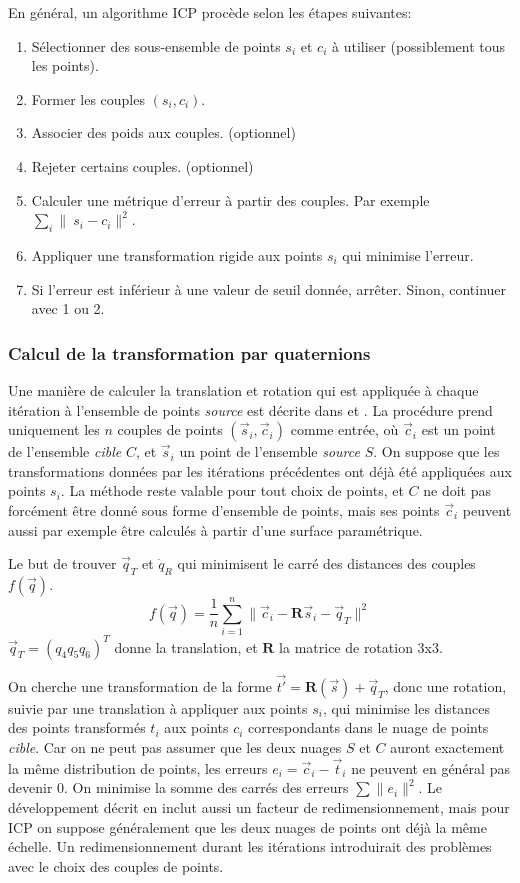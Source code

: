 \documentclass[a4paper,10pt]{scrreprt}
\begin{document}
En général, un algorithme ICP procède selon les étapes suivantes:
\begin{enumerate}
	\item Sélectionner des sous-ensemble de points ${s_i}$ et ${c_i}$ à utiliser (possiblement tous les points).
	\item Former les couples $(s_i, c_i)$.
	\item Associer des poids aux couples. (optionnel)
	\item Rejeter certains couples. (optionnel)
	\item Calculer une métrique d'erreur à partir des couples. Par exemple $\sum_{i} \|\ s_i - c_i \|^2$.
	\item Appliquer une transformation rigide aux points ${s_i}$ qui minimise l'erreur.
	\item Si l'erreur est inférieur à une valeur de seuil donnée, arrêter. Sinon, continuer avec 1 ou 2. 
\end{enumerate}


\subsubsection{Calcul de la transformation par quaternions}
Une manière de calculer la translation et rotation qui est appliquée à chaque itération à l'ensemble de points \emph{source} est décrite dans \cite{Besl1992} et \cite{Horn1986}. La procédure prend uniquement les $n$ couples de points $(\vec{s}_i, \vec{c}_i)$ comme entrée, où $\vec{c}_i$ est un point de l'ensemble \emph{cible} $C$, et $\vec{s}_i$ un point de l'ensemble \emph{source} $S$. On suppose que les transformations données par les itérations précédentes ont déjà été appliquées aux points $s_i$. La méthode reste valable pour tout choix de points, et $C$ ne doit pas forcément être donné sous forme d'ensemble de points, mais ses points $\vec{c}_i$ peuvent aussi par exemple être calculés à partir d'une surface paramétrique.

Le but de trouver $\vec{q}_T$ et $\dot{q}_R$ qui minimisent le carré des distances des couples $f(\vec{q})$.
\begin{equation}
	f(\vec{q}) = \frac{1}{n} \sum_{i=1}^{n} \| \vec{c}_i - \mathbf{R} \vec{s}_i - \vec{q}_T \|^2
\end{equation}
$\vec{q}_T = (q_4 q_5 q_6)^T$ donne la translation, et $\mathbf{R}$ la matrice de rotation 3x3.

On cherche une transformation de la forme $\vec{t'} = \mathbf{R}(\vec{s}) + \vec{q}_T$, donc une rotation, suivie par une translation à appliquer aux points $s_i$, qui minimise les distances des points transformés $t_i$ aux points $c_i$ correspondants dans le nuage de points \emph{cible}. Car on ne peut pas assumer que les deux nuages $S$ et $C$ auront exactement la même distribution de points, les erreurs $e_i = \vec{c}_i - \vec{t}_i$ ne peuvent en général pas devenir $0$. On minimise la somme des carrés des erreurs $\sum \| e_i \|^2$. Le développement décrit en \cite{Horn1986} inclut aussi un facteur de redimensionnement, mais pour ICP on suppose généralement que les deux nuages de points ont déjà la même échelle. Un redimensionnement durant les itérations introduirait des problèmes avec le choix des couples de points.
\end{document}
